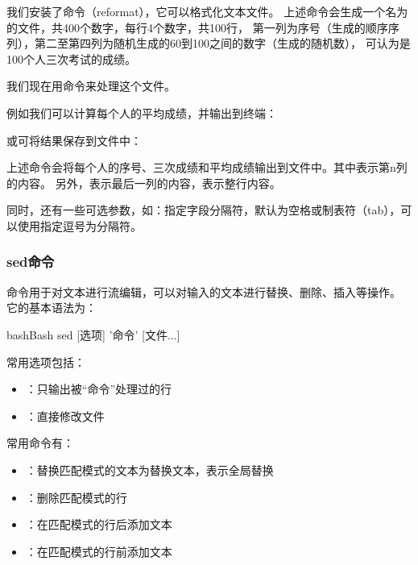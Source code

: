 我们安装了命令（reformat），它可以格式化文本文件。
上述命令会生成一个名为的文件，共400个数字，每行4个数字，共100行，
第一列为序号（生成的顺序序列），第二至第四列为随机生成的60到100之间的数字（生成的随机数），
可认为是100个人三次考试的成绩。

我们现在用命令来处理这个文件。

例如我们可以计算每个人的平均成绩，并输出到终端：

或可将结果保存到文件中：

上述命令会将每个人的序号、三次成绩和平均成绩输出到文件中。其中表示第n列的内容。
另外，表示最后一列的内容，表示整行内容。

同时，还有一些可选参数，如：指定字段分隔符，默认为空格或制表符（tab），可以使用指定逗号为分隔符。

\subsubsection{sed命令}
命令用于对文本进行流编辑，可以对输入的文本进行替换、删除、插入等操作。
它的基本语法为：
\begin{envcode}{bash}{Bash}
sed [选项] '命令' [文件...]
\end{envcode}
常用选项包括：
\begin{itemize}
\item {}：只输出被“命令”处理过的行
\item {}：直接修改文件
\end{itemize}

常用命令有：
\begin{itemize}
\item {}：替换匹配模式的文本为替换文本，表示全局替换
\item {}：删除匹配模式的行
\item {}：在匹配模式的行后添加文本
\item {}：在匹配模式的行前添加文本
\end{itemize}

